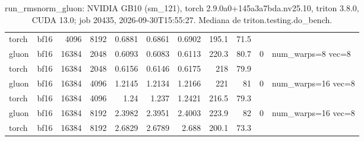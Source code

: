\begin{table}[htbp]
\begin{tabular}{llrrrrrrrll}
    torch & bf16 & 4096 & 8192 & 0.6881 & 0.6861 & 0.6902 & 195.1 & 71.5 &  &  \\
    gluon & bf16 & 16384 & 2048 & 0.6093 & 0.6083 & 0.6113 & 220.3 & 80.7 & 0 & num\_warps=8 vec=8 \\
    torch & bf16 & 16384 & 2048 & 0.6156 & 0.6146 & 0.6175 & 218 & 79.9 &  &  \\
    gluon & bf16 & 16384 & 4096 & 1.2145 & 1.2134 & 1.2166 & 221 & 81 & 0 & num\_warps=16 vec=8 \\
    torch & bf16 & 16384 & 4096 & 1.24 & 1.237 & 1.2421 & 216.5 & 79.3 &  &  \\
    gluon & bf16 & 16384 & 8192 & 2.3982 & 2.3951 & 2.4003 & 223.9 & 82 & 0 & num\_warps=16 vec=8 \\
    torch & bf16 & 16384 & 8192 & 2.6829 & 2.6789 & 2.688 & 200.1 & 73.3 &  &  \\
    \bottomrule
  \end{tabular}
  \caption{run\_rmsnorm\_gluon: NVIDIA GB10 (sm\_121), torch 2.9.0a0+145a3a7bda.nv25.10, triton 3.8.0, CUDA 13.0; job 20435, 2026-09-30T15:55:27. Mediana de triton.testing.do\_bench.}
  \label{tab:run-rmsnorm-gluon}
\end{table}
